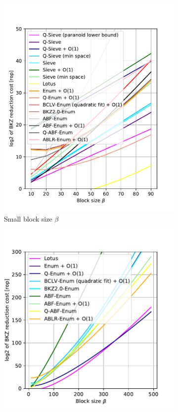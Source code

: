 \begin{figure}[h!]
\begin{subfigure}{0.49\textwidth}
        \includegraphics[width=1\textwidth]{graphics/cost_models_small_beta.pdf}
        \caption{Small block size $\beta$}\label{fig:costmodels-small-beta}
    \end{subfigure}
    \begin{subfigure}{0.5\textwidth}
        \centering
        \includegraphics[width=1\textwidth]{graphics/cost_models_enum.pdf}

\end{subfigure}
\end{figure}
